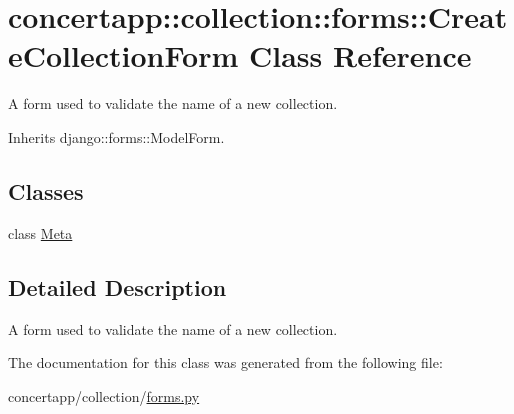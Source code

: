 \hypertarget{classconcertapp_1_1collection_1_1forms_1_1_create_collection_form}{
\section{concertapp::collection::forms::CreateCollectionForm Class Reference}
\label{classconcertapp_1_1collection_1_1forms_1_1_create_collection_form}
}


A form used to validate the name of a new collection.  




Inherits django::forms::ModelForm.

\subsection*{Classes}
\begin{DoxyCompactItemize}
\item 
class \hyperlink{classconcertapp_1_1collection_1_1forms_1_1_create_collection_form_1_1_meta}{Meta}
\end{DoxyCompactItemize}


\subsection{Detailed Description}
A form used to validate the name of a new collection. 

The documentation for this class was generated from the following file:\begin{DoxyCompactItemize}
\item 
concertapp/collection/\hyperlink{collection_2forms_8py}{forms.py}\end{DoxyCompactItemize}
